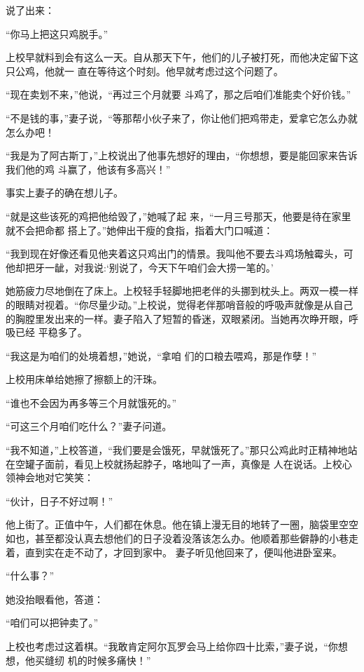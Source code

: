 \documentclass{article}
\begin{document}
说了出来： 


“你马上把这只鸡脱手。” 

上校早就料到会有这么一天。自从那天下午，他们的儿子被打死，而他决定留下这只公鸡，他就一
直在等待这个时刻。他早就考虑过这个问题了。 

“现在卖划不来，”他说，“再过三个月就要
斗鸡了，那之后咱们准能卖个好价钱。” 

“不是钱的事，”妻子说，“等那帮小伙子来了，你让他们把鸡带走，爱拿它怎么办就怎么办吧！

“我是为了阿古斯丁，”上校说出了他事先想好的理由，“你想想，要是能回家来告诉我们他的鸡
斗赢了，他该有多高兴！” 


事实上妻子的确在想儿子。 

“就是这些该死的鸡把他给毁了，”她喊了起
\newpage
来，“一月三号那天，他要是待在家里就不会把命都
搭上了。”她伸出干瘦的食指，指着大门口喊道： 

“我到现在好像还看见他夹着这只鸡出门的情景。我叫他不要去斗鸡场触霉头，可他却把牙一龇，对我说:‘别说了，今天下午咱们会大捞一笔的。’

她筋疲力尽地倒在了床上。上校轻手轻脚地把老伴的头挪到枕头上。两双一模一样的眼睛对视着。“你尽量少动。”上校说，觉得老伴那哨音般的呼吸声就像是从自己的胸膛里发出来的一样。妻子陷入了短暂的昏迷，双眼紧闭。当她再次睁开眼，呼吸已经
平稳多了。 

“我这是为咱们的处境着想，”她说，“拿咱
们的口粮去喂鸡，那是作孽！” 


上校用床单给她擦了擦额上的汗珠。 


“谁也不会因为再多等三个月就饿死的。” 

\newpage


“可这三个月咱们吃什么？”妻子问道。 

“我不知道，”上校答道，“我们要是会饿死，早就饿死了。”那只公鸡此时正精神地站在空罐子面前，看见上校就扬起脖子，咯地叫了一声，真像是
人在说话。上校心领神会地对它笑笑： 


“伙计，日子不好过啊！” 

他上街了。正值中午，人们都在休息。他在镇上漫无目的地转了一圈，脑袋里空空如也，甚至都没认真去想他们的日子没着没落该怎么办。他顺着那些僻静的小巷走着，直到实在走不动了，才回到家中。
妻子听见他回来了，便叫他进卧室来。 


“什么事？” 


她没抬眼看他，答道： 


“咱们可以把钟卖了。” 

\newpage

上校也考虑过这着棋。“我敢肯定阿尔瓦罗会马上给你四十比索，”妻子说，“你想想，他买缝纫
机的时候多痛快！” 
\end{document}

